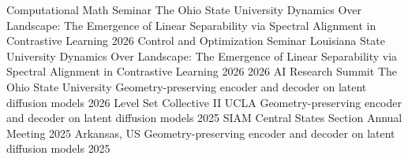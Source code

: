 

\begin{cvtalks}
\cvtalk
    {Computational Math Seminar} %
    {The Ohio State University}
    {Dynamics Over Landscape: The Emergence of Linear Separability via Spectral Alignment in Contrastive Learning} %
    {2026} %
\cvtalk
    {Control and Optimization Seminar} %
    {Louisiana State University}
    {Dynamics Over Landscape: The Emergence of Linear Separability via Spectral Alignment in Contrastive Learning} %
    {2026} %
\cvtalk
    {2026 AI Research Summit} %
    {The Ohio State University}
    {Geometry-preserving encoder and decoder on latent diffusion models} %
    {2026} %
\cvtalk
    {Level Set Collective II} %
    {UCLA}
    {Geometry-preserving encoder and decoder on latent diffusion models} %
    {2025} %
\cvtalk
    {SIAM Central States Section Annual Meeting 2025} %
    {Arkansas, US}
    {Geometry-preserving encoder and decoder on latent diffusion models} %
    {2025} %


\end{cvtalks}
